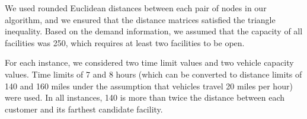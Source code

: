 \documentclass[11pt]{article}
\begin{document}

We used rounded Euclidean distances between each pair of nodes in
our algorithm, and we ensured that the distance matrices satisfied the triangle 
inequality. 
Based on the demand information, we assumed that the capacity of all facilities
was 250, which requires at least two facilities to be open.  
 
For each instance, we considered two time limit values and two vehicle capacity 
values. Time limits of 7 and 8 hours (which can be 
converted to distance limits of 140 and 160 miles under the assumption
that vehicles travel 20 miles per hour) were used. In all instances, 140 is more than 
twice the distance between each customer and its farthest candidate facility. 
\end{document}
